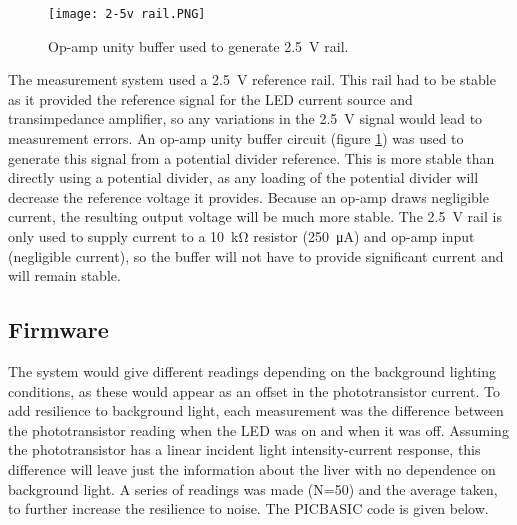 \begin{figure}[htb]
	\centering
	\texttt{[image: 2-5v rail.PNG]}
	\caption{Op-amp unity buffer used to generate \SI{2.5}{\volt} rail.}
	\label{fig: 2.5v rail}
\end{figure}

The measurement system used a \SI{2.5}{\volt} reference rail. This rail had to be stable as it provided the reference signal for the LED current source and transimpedance amplifier, so any variations in the \SI{2.5}{\volt} signal would lead to measurement errors. An op-amp unity buffer circuit (figure \ref{fig: 2.5v rail}) was used to generate this signal from a potential divider reference. This is more stable than directly using a potential divider, as any loading of the potential divider will decrease the reference voltage it provides. Because an op-amp draws negligible current, the resulting output voltage will be much more stable. The \SI{2.5}{\volt} rail is only used to supply current to a \SI{10}{\kilo\ohm} resistor (\SI{250}{\micro\ampere}) and op-amp input (negligible current), so the buffer will not have to provide significant current and will remain stable.\\




\subsection{Firmware}
The system would give different readings depending on the background lighting conditions, as these would appear as an offset in the phototransistor current. To add resilience to background light, each measurement was the difference between the phototransistor reading when the LED was on and when it was off. Assuming the phototransistor has a linear incident light intensity-current response, this difference will leave just the information about the liver with no dependence on background light. A series of readings was made (N=50) and the average taken, to further increase the resilience to noise. The PICBASIC code is given below.

